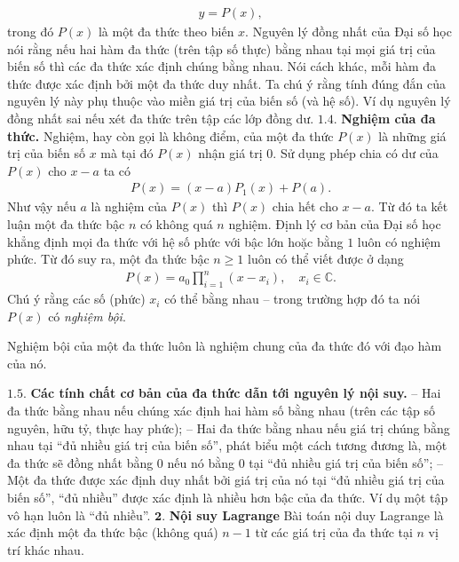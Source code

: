 \begin{multicols}{2}
	\begin{align*}
		y=P(x),
	\end{align*}
	trong đó $P(x)$ là một đa thức theo biến $x$.
	\vskip 0.1cm
	{\color{blue}Nguyên lý đồng nhất của Đại số học} nói rằng nếu hai hàm đa thức (trên tập số thực) bằng nhau tại mọi giá trị của biến số thì các đa thức xác định chúng bằng nhau. Nói cách khác, mỗi hàm đa thức được xác định bởi một đa thức duy nhất. 
	\vskip 0.1cm
	Ta chú ý rằng tính đúng đắn của nguyên lý này phụ thuộc vào miền giá trị của biến số (và hệ số). Ví dụ nguyên lý đồng nhất sai nếu xét đa thức trên tập các lớp đồng dư. 
	\vskip 0.1cm	
	$\pmb{1.4.}$ \textbf{\color{hoccungpi}Nghiệm của đa thức.}
	Nghiệm, hay còn gọi là không điểm, của một đa thức $P(x)$ là những giá trị của biến số $x$ mà tại đó $P(x)$ nhận giá trị $0$. Sử dụng phép chia có dư của $P(x)$ cho $x-a$ ta có
	\begin{align*}
		P(x)=(x-a)P_1(x)+P(a).
	\end{align*}
	Như vậy nếu $a$ là nghiệm của $P(x)$ thì $P(x)$ chia hết cho $x-a$. Từ đó ta kết luận một đa thức bậc $n$ {\color{blue} có không quá $n$ nghiệm}.
	\vskip 0.1cm
	{\color{blue} Định lý cơ bản của Đại số học} khẳng định mọi đa thức với hệ số phức với bậc lớn hoặc bằng $1$ luôn có nghiệm phức. 
	Từ đó suy ra, một đa thức bậc $n\geq 1$ luôn có thể viết được ở dạng
	\begin{align*}
		P(x)=a_0\prod_{i=1}^n(x-x_i), \quad x_i\in\mathbb C.
	\end{align*}
	Chú ý rằng các số (phức) $x_i$ có thể bằng nhau -- trong trường hợp đó ta nói $P(x)$ có {\em nghiệm bội}.
	\begin{tBox}
		Nghiệm bội của một đa thức luôn là nghiệm chung của đa thức đó với đạo hàm của nó. 
	\end{tBox}
	$\pmb{1.5.}$ \textbf{\color{hoccungpi}Các tính chất cơ bản của đa thức dẫn tới nguyên lý nội suy.}
	\vskip 0.1cm
	-- Hai đa thức bằng nhau nếu chúng xác định hai hàm số  bằng nhau (trên các tập số nguyên, hữu tỷ, thực hay phức);
	\vskip 0.1cm
	-- Hai đa thức bằng nhau nếu giá trị chúng bằng nhau tại ``đủ nhiều giá trị của biến số'', phát biểu một cách tương đương là, một đa thức sẽ đồng nhất bằng 0 nếu nó bằng $0$ tại ``đủ nhiều giá trị của biến số'';
	\vskip 0.1cm
	-- Một đa thức được xác định duy nhất bởi giá trị của nó tại ``đủ nhiều giá trị của biến số'', ``đủ nhiều'' được xác định là nhiều hơn bậc của đa thức. Ví dụ một tập vô hạn luôn là ``đủ nhiều''.
	\vskip 0.1cm
	$\pmb{2.}$ \textbf{\color{hoccungpi}Nội suy Lagrange}
	\vskip 0.1cm
	Bài toán nội duy Lagrange là xác định một đa thức bậc (không quá) $n-1$ từ các giá trị của đa thức tại $n$ vị trí khác nhau.

\end{multicols}
